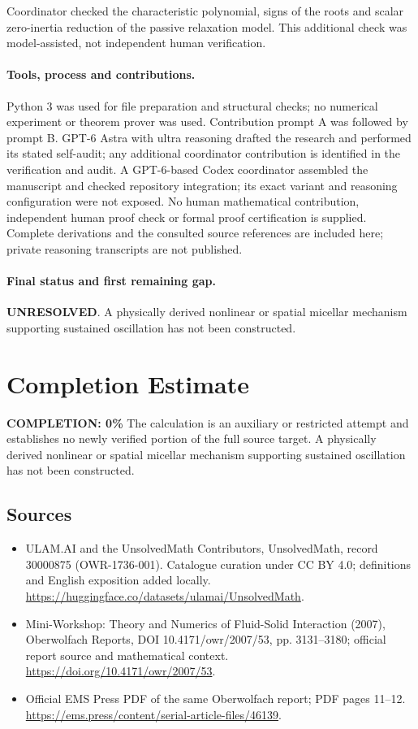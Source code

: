 \documentclass[11pt]{article}
\begin{document}
Coordinator checked the characteristic polynomial, signs of the roots and scalar zero-inertia reduction of the passive relaxation model. This additional check was model-assisted, not independent human verification.

\paragraph{Tools, process and contributions.}
Python 3 was used for file preparation and structural checks; no numerical experiment or theorem prover was used. Contribution prompt A was followed by prompt B. GPT-6 Astra with ultra reasoning drafted the research and performed its stated self-audit; any additional coordinator contribution is identified in the verification and audit. A GPT-6-based Codex coordinator assembled the manuscript and checked repository integration; its exact variant and reasoning configuration were not exposed. No human mathematical contribution, independent human proof check or formal proof certification is supplied. Complete derivations and the consulted source references are included here; private reasoning transcripts are not published.

\paragraph{Final status and first remaining gap.}
\textbf{UNRESOLVED}. A physically derived nonlinear or spatial micellar mechanism supporting sustained oscillation has not been constructed.

\section{Completion Estimate}
\noindent\textbf{COMPLETION: 0\%}
The calculation is an auxiliary or restricted attempt and establishes no newly verified portion of the full source target. A physically derived nonlinear or spatial micellar mechanism supporting sustained oscillation has not been constructed.

\subsection{Sources}
\begin{itemize}
\item[\hypertarget{source:30000875:1}{S1}] ULAM.AI and the UnsolvedMath Contributors, UnsolvedMath, record 30000875 (OWR-1736-001). Catalogue curation under CC BY 4.0; definitions and English exposition added locally.
\url{https://huggingface.co/datasets/ulamai/UnsolvedMath}.
\item[\hypertarget{source:30000875:2}{S2}] Mini-Workshop: Theory and Numerics of Fluid-Solid Interaction (2007), Oberwolfach Reports, DOI 10.4171/owr/2007/53, pp. 3131--3180; official report source and mathematical context.
\url{https://doi.org/10.4171/owr/2007/53}.
\item[\hypertarget{source:30000875:3}{S3}] Official EMS Press PDF of the same Oberwolfach report; PDF pages 11--12.
\url{https://ems.press/content/serial-article-files/46139}.
\end{itemize}
\label{end:30000875}
\end{document}
